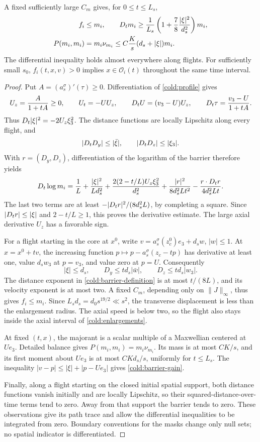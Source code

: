\begin{lemma}\label{cold:barrier}
A fixed sufficiently large \(C_m\) gives, for \(0\le t\le L_s\),
\begin{align}
 f_i&\le m_i,\qquad
 D_t m_i\ge \frac1{L_s}
       \left(1+\frac78\frac{|\xi|^2}{d_s^2}\right)m_i,
 \label{cold:barrier-derivative}\\
 P(m_i,m_i)&=m_i\nu_{m_i}
       \le C\frac K{s}(d_s+|\xi|)m_i.
 \label{cold:barrier-gain}
\end{align}
The differential inequality holds almost everywhere along flights.
For sufficiently small \(s_0\),
\(f_i(t,x,v)>0\) implies \(x\in\mathcal O_i(t)\) throughout the
same time interval.
\end{lemma}
\begin{proof}
Put \(A=(a_s^\sigma)'(\tau)\ge0\).  Differentiation of
\eqref{cold:profile} gives
\[
 U_z=\frac A{1+tA}\ge0,\qquad U_t=-UU_z,\qquad
 D_t U=(v_3-U)U_z,\qquad D_t\tau=\frac{v_3-U}{1+tA}.
\]
Thus \(D_t|\xi|^2=-2U_z\xi_3^2\).  The distance functions are locally
Lipschitz along every flight, and
\[
 |D_t D_y|\le|\bar\xi|,\qquad |D_t D_z|\le|\xi_3|.
\]
With \(r=(D_y,D_z)\), differentiation of the logarithm of the barrier
therefore yields
\[
 D_t\log m_i
 =\frac1L+\frac{|\xi|^2}{Ld_s^2}
   +\frac{2(2-t/L)U_z\xi_3^2}{d_s^2}
   +\frac{|r|^2}{8d_s^2Lt^2}
   -\frac{r\cdot D_t r}{4d_s^2Lt}.
\]
The last two terms are at least
\(-|D_t r|^2/(8d_s^2L)\), by completing a square.  Since
\(|D_t r|\le|\xi|\) and \(2-t/L\ge1\), this proves the derivative
estimate.  The large axial derivative \(U_z\) has a favorable sign.

For a flight starting in the core at \(x^0\), write
\(v=a_s^\sigma(z_c^0)e_3+d_sw\), \(|w|\le1\).
At \(x=x^0+tv\), the increasing function
\(p\mapsto p-a_s^\sigma(z_c-tp)\) has derivative at least one,
value \(d_sw_3\) at \(p=v_3\), and value zero at \(p=U\).
Consequently
\[
 |\xi|\le d_s,\qquad
 D_y\le td_s|\bar w|,\qquad D_z\le td_s|w_3|.
\]
The distance exponent in \eqref{cold:barrier-definition} is at most
\(t/(8L)\), and its velocity exponent is at most two.  A fixed
\(C_m\), depending only on \(\|J\|_\infty\), thus gives \(f_i\le m_i\).
Since \(L_sd_s=d_0s^{19/2}\ll s^2\), the transverse displacement is
less than the enlargement radius.  The axial speed is below two, so
the flight also stays inside the axial interval of
\eqref{cold:enlargements}.

At fixed \((t,x)\), the majorant is a scalar multiple of a Maxwellian
centered at \(Ue_3\).  Detailed balance gives
\(P(m_i,m_i)=m_i\nu_{m_i}\).  Its mass is at most \(CK/s\), and its
first moment about \(Ue_3\) is at most \(CKd_s/s\), uniformly for
\(t\le L_s\).  The inequality
\(|v-p|\le|\xi|+|p-Ue_3|\) gives \eqref{cold:barrier-gain}.

Finally, along a flight starting on the closed initial spatial
support, both distance functions vanish initially and are locally
Lipschitz, so their squared-distance-over-time terms tend to zero.
Away from that support the barrier tends to zero.  These observations
give its path trace and allow the differential inequalities to be
integrated from zero.  Boundary conventions for the masks change only
null sets; no spatial indicator is differentiated.
\end{proof}

